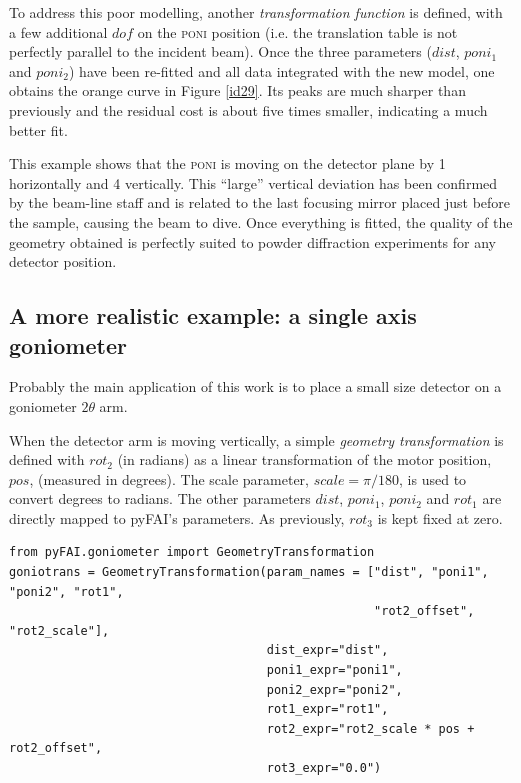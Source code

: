 \documentclass[preprint]{iucr}              %
\begin{document}
To address this poor modelling, another \textit{transformation function} is
defined, with a few additional $dof$ on the \textsc{poni} position
(i.e. the translation table is not perfectly parallel to the incident beam).
Once the three parameters ($dist$, $poni_1$ and $poni_2$) have been re-fitted and 
all data integrated with the new model, one obtains the orange
curve in Figure \ref{id29}. 
Its peaks are much sharper than previously and the residual cost is
about five times smaller, indicating a much better fit.

This example shows that the \textsc{poni} is moving on the detector
plane by 1 \textperthousand horizontally and 
4 \textperthousand vertically.
This ``large'' vertical deviation has been confirmed by the beam-line staff and
is related to the last focusing mirror placed just before the sample, causing the
beam to dive.
Once everything is fitted, the quality of the geometry obtained is perfectly
suited to powder diffraction experiments for any detector position.
  
\subsection{A more realistic example: a single axis goniometer}

Probably the main application of this work is to place a small size detector
on a goniometer $2\theta$ arm. 

When the detector arm is moving vertically, a simple \textit{geometry
transformation} is defined with $rot_2$ (in radians) as a
linear transformation of the motor position, $pos$, (measured in degrees).
The scale parameter, $scale = \pi / 180$, is used to convert degrees to radians.
The other parameters $dist$, $poni_1$, $poni_2$ and $rot_1$ are directly mapped
to pyFAI's parameters.
As previously, $rot_3$ is kept fixed at zero.

\begin{verbatim}
from pyFAI.goniometer import GeometryTransformation
goniotrans = GeometryTransformation(param_names = ["dist", "poni1", "poni2", "rot1",
                                                   "rot2_offset", "rot2_scale"],
                                    dist_expr="dist", 
                                    poni1_expr="poni1",
                                    poni2_expr="poni2", 
                                    rot1_expr="rot1", 
                                    rot2_expr="rot2_scale * pos + rot2_offset", 
                                    rot3_expr="0.0")
\end{verbatim}
\end{document}
